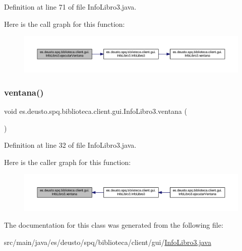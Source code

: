 Definition at line 71 of file Info\+Libro3.\+java.

Here is the call graph for this function\+:
\nopagebreak
\begin{figure}[H]
\begin{center}
\leavevmode
\includegraphics[width=350pt]{classes_1_1deusto_1_1spq_1_1biblioteca_1_1client_1_1gui_1_1_info_libro3_a688fb88d1ba1c2b6fb5e48e786dfd0e4_cgraph}
\end{center}
\end{figure}
\mbox{\label{classes_1_1deusto_1_1spq_1_1biblioteca_1_1client_1_1gui_1_1_info_libro3_a923986e267f32a335e7d675c68926277}} 
\subsubsection{\texorpdfstring{ventana()}{ventana()}}
{\footnotesize\ttfamily void es.\+deusto.\+spq.\+biblioteca.\+client.\+gui.\+Info\+Libro3.\+ventana (\begin{DoxyParamCaption}{ }\end{DoxyParamCaption})}



Definition at line 32 of file Info\+Libro3.\+java.

Here is the caller graph for this function\+:
\nopagebreak
\begin{figure}[H]
\begin{center}
\leavevmode
\includegraphics[width=350pt]{classes_1_1deusto_1_1spq_1_1biblioteca_1_1client_1_1gui_1_1_info_libro3_a923986e267f32a335e7d675c68926277_icgraph}
\end{center}
\end{figure}


The documentation for this class was generated from the following file\+:\begin{DoxyCompactItemize}
\item 
src/main/java/es/deusto/spq/biblioteca/client/gui/\mbox{\hyperlink{_info_libro3_8java}{Info\+Libro3.\+java}}\end{DoxyCompactItemize}

